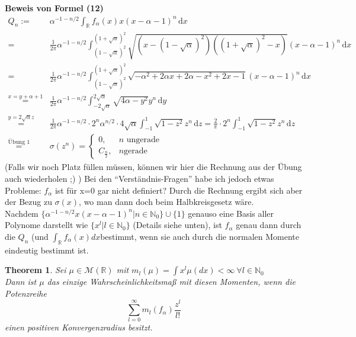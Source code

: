 \documentclass[a4paper, 11pt]{scrreprt}
\newtheorem{theorem}[defi]{Theorem}
\newcommand{\RR}{\mathbb{R}}
\newcommand{\NN}{\mathbb{N}}
\begin{document}
\textbf{Beweis von Formel (12)}\\
\begin{align*}
	Q_n :=& \alpha^{-1-n/2}\int_{\RR} f_{\alpha}(x)x(x-\alpha -1)^n\,\mathrm{d}x \\
	 =& \frac{1}{2\pi}\alpha^{-1-n/2} \int_{(1-\sqrt{\alpha})^2}^{(1+\sqrt{\alpha})^2} \sqrt{(x-(1-\sqrt{\alpha})^2)((1+\sqrt{\alpha})^2-x)} (x-\alpha -1)^n \,\mathrm{d}x\\
	=& \frac{1}{2\pi}\alpha^{-1-n/2} \int_{(1-\sqrt{\alpha})^2}^{(1+\sqrt{\alpha})^2} \sqrt{-\alpha^2+2\alpha x+2\alpha -x^2+2x-1}(x-\alpha-1)^n \,\mathrm{d}x\\
	\overset{x=y+\alpha+1}{=}& \frac{1}{2\pi}\alpha^{-1-n/2} \int_{-2\sqrt{\alpha}}^{2\sqrt{\alpha}} \sqrt{4\alpha -y^2} y^n \,\mathrm{d}y\\
	\overset{y=2\sqrt{\alpha}z}{=}& \frac{1}{2\pi}\alpha^{-1-n/2} \cdot 2^n \alpha^{n/2}\cdot4\sqrt{\alpha}\int_{-1}^{1} \sqrt{1-z^2}z^n \,\mathrm{d}z = \frac{2}{\pi} \cdot 2^n\int_{-1}^{1} \sqrt{1-z^2}z^n\,\mathrm{d}z \\
	\overset{\text{Übung 1}}{=}& \sigma(z^n) = \begin{cases} 0, &n\text{ ungerade}\\
	C_{\frac n 2}, &n\text{gerade} \end{cases}
\end{align*}
(Falls wir noch Platz füllen müssen, können wir hier die Rechnung aus der Übung auch wiederholen ;) )
Bei den "`Verständnis-Fragen"' habe ich jedoch etwas Probleme: \(f_{\alpha}\) ist für x=0 gar nicht definiert? Durch die Rechnung ergibt sich aber der Bezug zu \(\sigma(x)\), wo man dann doch beim Halbkreisgesetz wäre.\\


Nachdem $\lbrace \alpha^{-1-n/2} x(x-\alpha -1)^n \vert n \in \NN_{0}\rbrace \cup \lbrace 1 \rbrace$ genauso eine Basis aller Polynome darstellt wie $ \lbrace x^l \vert l \in \NN_{0} \rbrace $ (Details siehe unten), ist $ f_{\alpha} $ genau dann durch die $ Q_n $ (und $ \int_{\RR} f_{\alpha}(x)dx $bestimmt, wenn sie auch durch die normalen Momente eindeutig bestimmt ist. 

\begin{theorem}
Sei $ \mu \in \mathcal{M}(\RR) $ mit $ m_l (\mu)=\int x^l \mu(dx) < \infty~ \forall l \in \NN_{0} $\\
Dann ist $ \mu $ das einzige Wahrscheinlichkeitsmaß mit diesen Momenten, wenn die Potenzreihe 
\[\sum_{l=0}^\infty m_l(f_\alpha) \frac{z^l}{l!}\]
einen positiven Konvergenzradius besitzt.
\end{theorem}
\end{document}
